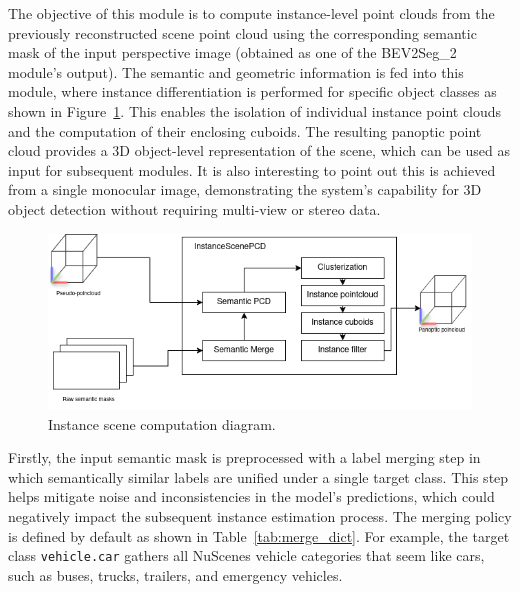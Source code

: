 The objective of this module is to compute instance-level point clouds from the previously reconstructed scene point cloud using the corresponding semantic mask of the input perspective image (obtained as one of the BEV2Seg\_2 module's output). The semantic and geometric information is fed into this module, where instance differentiation is performed for specific object classes as shown in Figure~\ref{fig:instance_scene_diagram}. This enables the isolation of individual instance point clouds and the computation of their enclosing cuboids. The resulting panoptic point cloud provides a 3D object-level representation of the scene, which can be used as input for subsequent modules. It is also interesting to point out this is achieved from a single monocular image, demonstrating the system's capability for 3D object detection without requiring multi-view or stereo data.

\begin{figure}[h!]
    \centering
    \includegraphics[width=0.5\linewidth]{images/methodology/instance_scene_flow_diagram.png}
    \caption{Instance scene computation diagram.}
    \label{fig:instance_scene_diagram}
\end{figure}

Firstly, the input semantic mask is preprocessed with a label merging step in which semantically similar labels are unified under a single target class. This step helps mitigate noise and inconsistencies in the model's predictions, which could negatively impact the subsequent instance estimation process. The merging policy is defined by default as shown in Table~\ref{tab:merge_dict}. For example, the target class \texttt{vehicle.car} gathers all NuScenes vehicle categories that seem like cars, such as buses, trucks, trailers, and emergency vehicles.

